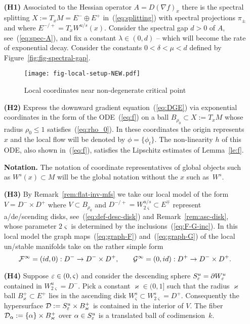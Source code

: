 \documentclass{article}
\begin{document}
\begin{definition}
\label{def:loc-coord-lambda}
\mbox{ }

\begin{enumerate}
\item[\bf (H1)]
  Associated to the Hessian operator $A=D(\nabla f)_x$ there
  is the spectral splitting $X:=T_xM=E^-\oplus E^+$
  in~(\ref{eq:splitting}) with spectral projections $\pi_\pm$
  and where $E^{-/+}=T_xW^{u/s}(x)$.
  Consider the spectral gap $d>0$ of $A$, see~(\ref{eq:spec-A}), and fix a constant
  $\lambda\in(0,d)$ -- which will become the rate of
  exponential decay. Consider the constants
  $0<\delta<\mu<d$ defined by Figure~\ref{fig:fig-spectral-gap}.
%
\begin{figure}%
  \centering
  \texttt{[image: fig-local-setup-NEW.pdf]}
  \caption{Local coordinates near non-degenerate critical point}
  \label{fig:fig-local-setup-NEW}
\end{figure}
%
\item[\bf (H2)]
  Express the downward gradient equation~(\ref{eq:DGE})
  via exponential coordinates in the form of the ODE~(\ref{eq:f})
  on a ball $B_{\rho_0}\subset X:=T_xM$ whose radius
  $\rho_0\le 1$ satisfies~(\ref{eq:rho_0}).
  In these coordinates the origin represents $x$
  and the local flow will be denoted by $\phi=\{\phi_t\}$.
  The non-linearity $h$ of this ODE, also shown in~(\ref{eq:f}),
  satisfies the Lipschitz estimates of Lemma~\ref{le:f}.

\noindent
{\bf Notation.} The notation of coordinate representatives of global
objects such as $W^s(x)\subset M$ will be the global notation
without the $x$ such as~$W^s$.
%
\item[\bf (H3)]
  By Remark~\ref{rem:flat-inv-mfs} we take our local model of
  the form $V=D^-\times D^+$ where $V \subset B_{\rho_0}$ and
  $D^{-/+}=W^{u/s}_{2\varsigma}\subset E^\mp$ represent a/de/scending
  disks, see~(\ref{eq:def-desc-disk}) and Remark~\ref{rem:asc-disk},
  whose parameter $2\varsigma$ is determined by
  the inclusions~(\ref{eq:F-G-inc}).
  In this local model the graph maps~(\ref{eq:graph-F}) and~(\ref{eq:graph-G})
  of the local un/stable manifolds take on the rather simple form
  $$
      {\mathcal{F}}^\infty=(id,0):D^-\to D^-\times D^+,\qquad
      {\mathcal{G}}^\infty=(0,id):D^+\to D^-\times D^+.
  $$

\item[\bf (H4)]
Suppose ${\varepsilon}\in(0,\varsigma)$ and consider the descending sphere
$S^u_{\varepsilon}={\partial} W^u_{\varepsilon}$ contained in $W^u_{2\varsigma}=D^-$.
Pick a constant $\varkappa\in(0,1]$ such that the radius $\varkappa$ ball
$B_\varkappa^+\subset E^+$ lies in the ascending disk
$W^s_{\varsigma}\subset W^s_{2\varsigma}=D^+$. Consequently the hypersurface
${\mathcal{D}}:=S^u_{\varepsilon}\times B_\varkappa^+$ is contained in the interior of $V$.
The fiber ${\mathcal{D}}_{\alpha}:=\{{\alpha}\}\times B_\varkappa^+$ over ${\alpha}\in S^u_{\varepsilon}$
is a translated ball of codimension~$k$.
\end{enumerate}
\end{definition}
\end{document}
